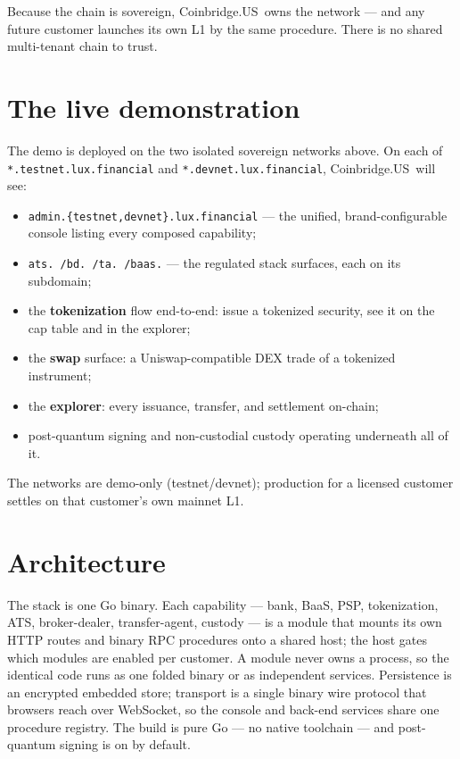 \documentclass[11pt,a4paper]{article}
\newcommand{\customer}{Coinbridge.US}
\begin{document}
Because the chain is sovereign, \customer\ owns the network --- and any
future customer launches its own L1 by the same procedure. There is no
shared multi-tenant chain to trust.

\section{The live demonstration}

The demo is deployed on the two isolated sovereign networks above. On each
of \texttt{*.testnet.lux.financial} and \texttt{*.devnet.lux.financial},
\customer\ will see:

\begin{itemize}[leftmargin=*]
  \item \texttt{admin.\{testnet,devnet\}.lux.financial} --- the unified,
  brand-configurable console listing every composed capability;
  \item \texttt{ats.\,/bd.\,/ta.\,/baas.} --- the regulated stack
  surfaces, each on its subdomain;
  \item the \textbf{tokenization} flow end-to-end: issue a tokenized
  security, see it on the cap table and in the explorer;
  \item the \textbf{swap} surface: a Uniswap-compatible DEX trade of a
  tokenized instrument;
  \item the \textbf{explorer}: every issuance, transfer, and settlement
  on-chain;
  \item post-quantum signing and non-custodial custody operating
  underneath all of it.
\end{itemize}

The networks are demo-only (testnet/devnet); production for a licensed
customer settles on that customer's own mainnet L1.

\section{Architecture}

The stack is one Go binary. Each capability --- bank, BaaS, PSP,
tokenization, ATS, broker-dealer, transfer-agent, custody --- is a module
that mounts its own HTTP routes and binary RPC procedures onto a shared
host; the host gates which modules are enabled per customer. A module
never owns a process, so the identical code runs as one folded binary or
as independent services. Persistence is an encrypted embedded store;
transport is a single binary wire protocol that browsers reach over
WebSocket, so the console and back-end services share one procedure
registry. The build is pure Go --- no native toolchain --- and
post-quantum signing is on by default.
\end{document}
